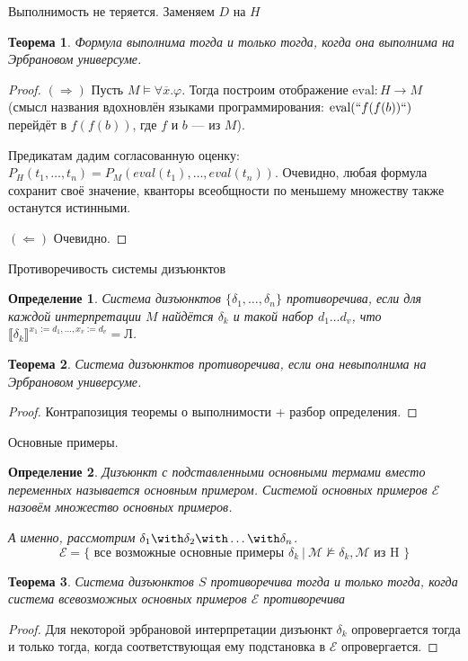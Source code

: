 \documentclass[aspectratio=169]{beamer}
\newtheorem{thm}{Теорема}[section]
\newtheorem{dfn}{Определение}[section]
\begin{document}
\begin{frame}{Выполнимость не теряется. Заменяем $D$ на $H$}
\begin{thm}Формула выполнима тогда и только тогда, когда она выполнима на Эрбрановом универсуме.\end{thm}
\begin{proof}
$(\Rightarrow)$ Пусть $M \models\forall \overline{x}.\varphi$. Тогда построим отображение $\text{eval}: H \rightarrow M$
(смысл названия вдохновлён языками программирования: $\text{eval}(``f(f(b))``)$ перейдёт в $f(f(b))$, где $f$ и $b$ --- из $M$).

Предикатам дадим согласованную оценку:
$P_H(t_1,\dots,t_n) = P_M(eval(t_1),\dots,eval(t_n))$. Очевидно, любая формула сохранит своё значение, кванторы всеобщности
по меньшему множеству также останутся истинными.

$(\Leftarrow)$ Очевидно.
\end{proof}\end{frame}

\begin{frame}{Противоречивость системы дизъюнктов}
\begin{dfn}Система дизъюнктов $\{\delta_1,\dots,\delta_n\}$ противоречива,
если для каждой интерпретации $M$ найдётся $\delta_k$ и такой набор $d_1\dots d_v$,
что $\llbracket\delta_k\rrbracket^{x_1 := d_1, \dots, x_v := d_v} = \text{Л}$.\end{dfn}
\begin{thm}Система дизъюнктов противоречива, если она невыполнима на Эрбрановом универсуме.\end{thm}
\begin{proof}Контрапозиция теоремы о выполнимости + разбор определения.
\end{proof}
\end{frame}


\begin{frame}{Основные примеры.}
\begin{dfn}
Дизъюнкт с подставленными основными термами вместо переменных называется основным примером.
Системой основных примеров $\mathcal{E}$ назовём множество основных примеров.

А именно, рассмотрим $\delta_1\with\delta_2\with\dots\with\delta_n$. 
$$\mathcal{E} = \{ \text{ все возможные основные примеры }\delta_k\ |\ \mathcal{M} \not\models \delta_k, \mathcal{M}\text{ из H }\}$$
\end{dfn}\vspace{-0.5cm}
\begin{thm}Система дизъюнктов $S$ противоречива тогда и только тогда, когда система всевозможных
основных примеров $\mathcal{E}$ противоречива\end{thm}
\begin{proof}Для некоторой эрбрановой интерпретации дизъюнкт $\delta_k$
опровергается тогда и только тогда, когда соответствующая ему подстановка в $\mathcal{E}$ опровергается.
\end{proof}\end{frame}
\end{document}
